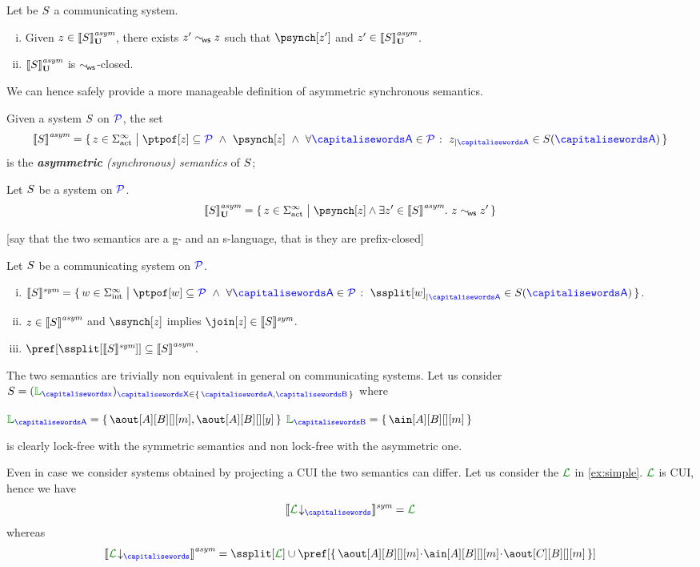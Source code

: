   
\begin{lemma}
Let be $S$ a communicating system.
\begin{enumerate}[i)]
\item
Given $z\in {\llbracket S\rrbracket}^{\textit{asym}}_{\mathbf{U}}$, there exists $z'\sim_{\!\mathsf{ws}} z$ such that $\psynch[z']$ and $z'\in {\llbracket S\rrbracket}^{\textit{asym}}_{\mathbf{U}}$.
\item
${\llbracket S \rrbracket}^{\textit{asym}}_{\mathbf{U}}$ is $\sim_{\!\mathsf{ws}}$-closed.
\end{enumerate}
\end{lemma}
 
We can hence safely provide a more manageable definition of asymmetric synchronous semantics. 
\begin{definition}\label{def:syncSem}
  Given a system $S$ on $\mathcal{\color{blue}{P}}$, the set
  \[
	 \asem{\aCS} = \Set{z \in \alfact^\infty \sst \ptpof[z] \subseteq \ptpset \ \land\ \psynch[z]\  \land\ \forall \p \in
		\ptpset \qst \filter{z}{\p} \in \aCS(\p)  }
  \]
  is the \emph{{\bf asymmetric} (synchronous) semantics} of $S$;
\end{definition}

\begin{lemma}
Let $S$ be a system on $\mathcal{\color{blue}{P}}$.
$$\gasem{\aCS} = \Set{z\in\alfact^\infty \sst  \psynch[z] \land \exists z'\in\asem{\aCS}.\  z\commds z'}$$ 
\end{lemma}

[say that the two semantics are a g- and an s-language, that is they are prefix-closed]

\begin{lemma}
\label{fac:asymmsubsymm}
Let  $S$ be a communicating system on $\mathcal{\color{blue}{P}}$.
\begin{enumerate}[i)]
\item
$\ssem{\aCS} =  
\Set{\acword \in \alfint^\infty \sst  
\ptpof[\acword] \subseteq \ptpset \ \land\ \forall \p \in \ptpset \qst \filter{\ssplit[\acword]}{\p} \in \aCS(\p)}$.
\item
\label{fac:asymmsubsymm-aimps}
$z\in{\llbracket S\rrbracket}^{\textit{asym}}$ and $\ssynch[z]$ implies $\join[z]\in\ssem{\aCS}$.
\item
\label{fac:asymmsubsymm-asubs}
$\pref[{\ssplit[{\ssem{\aCS}}]}] \subseteq \asem{\aCS}$.
\end{enumerate}
\end{lemma}

\begin{example}
\label{ex:simple2}
The two semantics are trivially non equivalent in general on communicating systems.
Let us consider $\aCS = ({\alang}_{\px})_{\ptp[X] \in \Set{\p,\q}}$ where\\
\centerline{$\alang_{\p}= \Set{\aout[A][B][][m], \aout[A][B][][y]}$ \qquad $\alang_{\q}= \Set{\ain[A][B][][m]}$ }
is clearly lock-free with the symmetric semantics and non lock-free with the asymmetric one.

 Even in case we consider systems
obtained by projecting a CUI \sclang the two semantics can differ. 
Let us consider the \sclang $\clang$ in \cref{ex:simple}.
$\clang$ is CUI, hence we have 
  $$\ssem{\proj{\clang}{}} = \clang$$ 
whereas 
  $$\asem{\proj{\clang}{}} = \ssplit[\clang] \cup \pref[\Set{\aout[A][B][][m]\cat\ain[A][B][][m]\cat\aout[C][B][][m]}]$$
\finex
\end{example} 

